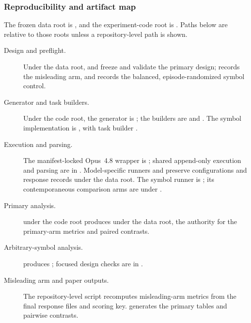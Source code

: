\subsubsection{Reproducibility and artifact map}
The frozen data root is
,
and the experiment-code root is . Paths below are
relative to those roots unless a repository-level path is shown.
\begin{description}
  \item[Design and preflight.]
  Under the data root,  and
   freeze and validate the primary design;
   records the misleading arm,
  and  records the balanced,
  episode-randomized symbol control.

  \item[Generator and task builders.]
  Under the code root, the generator is
  ; the builders are
   and
  . The symbol implementation is
  , with task builder
  .

  \item[Execution and parsing.]
  The manifest-locked Opus~4.8 wrapper is
  ; shared
  append-only execution and parsing are in
  . Model-specific runners and
   preserve configurations
  and response records under the data root. The symbol runner is
  ; its contemporaneous comparison arms
  are under .

  \item[Primary analysis.]
   under the
  code root produces  under the data root,
  the authority for the primary-arm metrics and paired contrasts.

  \item[Arbitrary-symbol analysis.]
   produces
  ; focused design checks are in
  .

  \item[Misleading arm and paper outputs.]
  The repository-level script
   recomputes misleading-arm
  metrics from the final response files and scoring key.
   generates the primary tables
  and pairwise contrasts.
\end{description}
